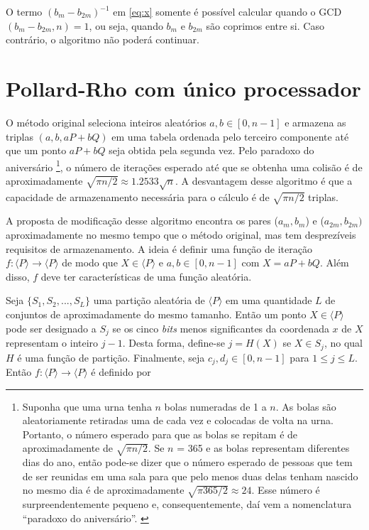 O termo $(b_m - b_{2m})^{-1}$ em \ref{eq:x} somente é possível calcular quando o GCD$(b_m - b_{2m}, n) = 1$, ou seja, quando \(b_m\) e \(b_{2m}\) são coprimos entre si. Caso contrário, o algoritmo não poderá continuar.

%
%
\section{Pollard-Rho com único processador}
O método original seleciona inteiros aleatórios $a, b \in [0, n-1]$ e armazena as triplas $(a, b, aP + bQ)$ em uma tabela ordenada pelo terceiro componente até que um ponto $aP + bQ$ seja obtida pela segunda vez. Pelo paradoxo do aniversário
\footnote{Suponha que uma urna tenha \(n\) bolas numeradas de 1 a \(n\). As bolas são aleatoriamente retiradas uma de cada vez e colocadas de volta na urna. Portanto, o número esperado para que as bolas se repitam é de aproximadamente de $\sqrt{\pi n/2}$. Se \(n\) = 365 e as bolas representam diferentes dias do ano, então pode-se dizer que o número esperado de pessoas que tem de ser reunidas em uma sala para que pelo menos duas delas tenham nascido no mesmo dia é de aproximadamente $\sqrt{\pi 365/2} \approx 24$. Esse número é surpreendentemente pequeno e, consequentemente, daí vem a nomenclatura ``paradoxo do aniversário''. \cite{Guide}},
o número de iterações esperado até que se obtenha uma colisão é de aproximadamente $\sqrt{\pi n/2} \approx 1.2533 \sqrt{n}$. A desvantagem desse algoritmo é que a capacidade de armazenamento necessária para o cálculo é de $\sqrt{\pi n/2}$ triplas.

A proposta de modificação desse algoritmo encontra os pares ($a_m, b_m$) e ($a_{2m}, b_{2m})$ aproximadamente no mesmo tempo que o método original, mas tem desprezíveis requisitos de armazenamento. A ideia é definir uma função de iteração $f : \langle P \rangle \to \langle P \rangle$ de modo que $X \in \langle P \rangle$ e $a, b \in [0, n-1]$ com $X = aP + bQ$. Além disso, \(f\) deve ter características de uma função aleatória.

Seja $\{S_1, S_2, ..., S_L\}$ uma partição aleatória de $\langle P \rangle$ em uma quantidade \(L\) de conjuntos de aproximadamente do mesmo tamanho. Então um ponto $X \in \langle P \rangle$ pode ser designado a \(S_j\) se os cinco \textit{bits} menos significantes da coordenada \(x\) de \(X\) representam o inteiro \(j-1\). Desta forma, define-se $j = H(X)$ se $X \in S_j$, no qual \(H\) é uma função de partição. Finalmente, seja $c_j, d_j \in [0, n-1]$ para $1 \leq j \leq L$. Então $f : \langle P \rangle \to  \langle P \rangle$ é definido por

